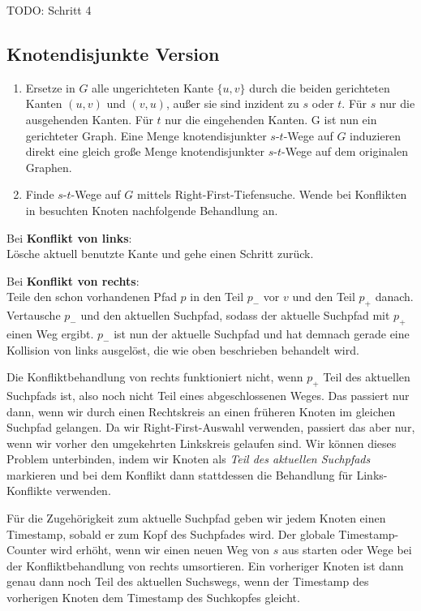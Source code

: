 \documentclass[10pt,a4paper]{article}
\begin{document}
TODO: Schritt 4 %

\subsection{Knotendisjunkte Version}
\begin{enumerate}
    \item Ersetze in $G$ alle ungerichteten Kante $\{u, v\}$ durch die
        beiden gerichteten Kanten $(u,v)$ und $(v, u)$, außer sie sind inzident
        zu $s$ oder $t$.
        Für $s$ nur die ausgehenden Kanten.
        Für $t$ nur die eingehenden Kanten.
        G ist nun ein gerichteter Graph.
        Eine Menge knotendisjunkter $s$-$t$-Wege auf $G$ induzieren direkt eine
        gleich große Menge knotendisjunkter $s$-$t$-Wege auf dem originalen
        Graphen.
    \item Finde $s$-$t$-Wege auf $G$ mittels Right-First-Tiefensuche.
        Wende bei Konflikten in besuchten Knoten nachfolgende Behandlung an.
\end{enumerate}

Bei \textbf{Konflikt von links}:\\
Lösche aktuell benutzte Kante und gehe einen Schritt zurück.

Bei \textbf{Konflikt von rechts}:\\
Teile den schon vorhandenen Pfad $p$ in den Teil $p_-$ vor $v$ und den Teil
$p_+$ danach.
Vertausche $p_-$ und den aktuellen Suchpfad, sodass der aktuelle Suchpfad mit
$p_+$ einen Weg ergibt.
$p_-$ ist nun der aktuelle Suchpfad und hat demnach gerade eine Kollision von
links ausgelöst, die wie oben beschrieben behandelt wird.

Die Konfliktbehandlung von rechts funktioniert nicht, wenn $p_+$ Teil des
aktuellen Suchpfads ist, also noch nicht Teil eines abgeschlossenen Weges.
Das passiert nur dann, wenn wir durch einen Rechtskreis an einen früheren
Knoten im gleichen Suchpfad gelangen.
Da wir Right-First-Auswahl verwenden, passiert das aber nur, wenn wir vorher
den umgekehrten Linkskreis gelaufen sind.
Wir können dieses Problem unterbinden, indem wir Knoten als \textit{Teil des
aktuellen Suchpfads} markieren und bei dem Konflikt dann stattdessen die
Behandlung für Links-Konflikte verwenden.

Für die Zugehörigkeit zum aktuelle Suchpfad geben wir jedem Knoten einen
Timestamp, sobald er zum Kopf des Suchpfades wird.
Der globale Timestamp-Counter wird erhöht, wenn wir einen neuen Weg von $s$ aus
starten oder Wege bei der Konfliktbehandlung von rechts umsortieren.
Ein vorheriger Knoten ist dann genau dann noch Teil des aktuellen Suchswegs,
wenn der Timestamp des vorherigen Knoten dem Timestamp des Suchkopfes gleicht.
\end{document}
